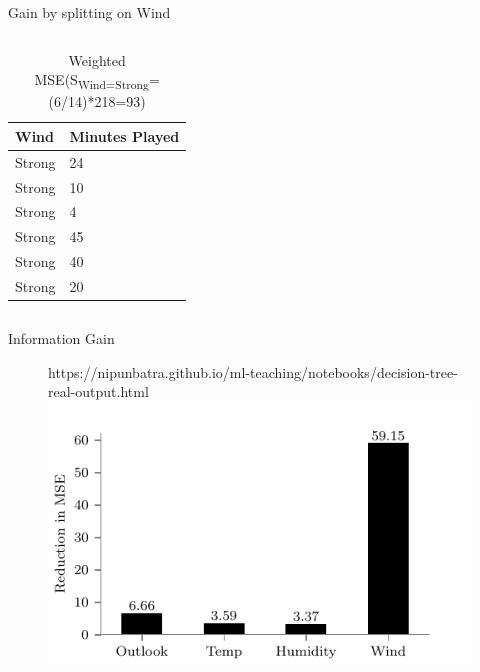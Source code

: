 \documentclass[usenames,dvipsnames]{beamer}
\begin{document}
\begin{frame}{Gain by splitting on Wind}
\begin{columns}
\begin{column}{.5\textwidth}
	\begin{tiny}
	
	\begin{table}[]
		\begin{tabular}{@{}ll@{}}
			\toprule
			\textbf{Wind} & \textbf{Minutes Played} \\ \midrule

			Strong        & 24                      \\
			Strong        & 10                      \\
			Strong        & 4                       \\
			Strong        & 45                      \\
			Strong        & 40                      \\
			Strong        & 20                      \\ \bottomrule
		\end{tabular}
\caption{Weighted MSE(S\textsubscript{Wind=Strong}=(6/14)*218=93)}
	\end{table}
\end{tiny}

\end{column}
\end{columns}
\end{frame}






\begin{frame}{Information Gain}

	\begin{figure}[htp]
		\centering
		\begin{notebookbox}{https://nipunbatra.github.io/ml-teaching/notebooks/decision-tree-real-output.html}
		  \includegraphics[width=\linewidth]{../assets/decision-trees/figures/discrete-input-real-output-level-1.pdf}
		\end{notebookbox}
	  \end{figure}

\end{frame}
\end{document}
